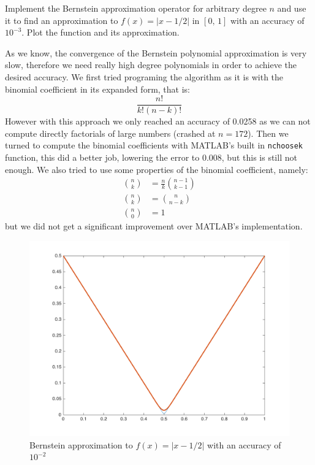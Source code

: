 \begin{problem}
Implement the Bernstein approximation operator for arbitrary degree $n$ and use it to find an approximation to $f(x) = \lvert x - 1/2 \rvert$ in $[0,\, 1]$ with an accuracy of $10^{-3}$. Plot the function and its approximation.
\end{problem}

\begin{solution}
As we know, the convergence of the Bernstein polynomial approximation is very slow, therefore we need really high degree polynomials in order to achieve the desired accuracy. We first tried programing the algorithm as it is with the binomial coefficient in its expanded form, that is:
\begin{equation*}
\frac{n!}{k!(n-k)!}
\end{equation*}
However with this approach we only reached an accuracy of 0.0258 as we can not compute directly factorials of large numbers (crashed at $n = 172$). Then we turned to compute the binomial coefficients with MATLAB's built in \texttt{nchoosek} function, this did a better job, lowering the error to 0.008, but this is still not enough. We also tried to use some properties of the binomial coefficient, namely:
\begin{align*}
\binom{n}{k} &= \frac{n}{k}\binom{n-1}{k-1} \\
\binom{n}{k} &= \binom{n}{n-k} \\
\binom{n}{0} & = 1
\end{align*}
but we did not get a significant improvement over MATLAB's implementation.
\begin{figure}[h]
\centering 
\includegraphics[scale = 0.25]{task2hw3.png}
\caption{Bernstein approximation to $f(x) = \lvert x-1/2 \rvert$ with an accuracy of $10^{-2}$}
\label{task2hw3fig}
\end{figure}
\end{solution}